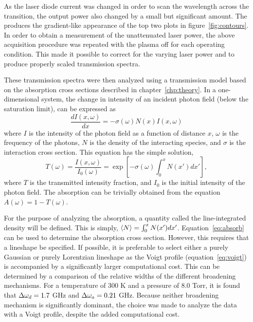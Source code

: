 As the laser diode current was changed in order to scan the wavelength across
the transition, the output power also changed by a small but significant amount.
The produces the gradient-like appearance of the top two plots in
figure~\ref{fig:contours}. In order to obtain a measurement of the unattenuated
laser power, the above acquisition procedure was repeated with the plasma off
for each operating condition. This made it possible to correct for the varying
laser power and to produce properly scaled transmission spectra.

These transmission spectra were then analyzed using a transmission model based
on the absorption cross sections described in chapter~\ref{chp:theory}. In a
one-dimensional system, the change in intensity of an incident photon field
(below the saturation limit), can be expressed as
\begin{equation}
  \frac{dI(x, \omega)}{dx} = -\sigma(\omega) N(x) I(x, \omega)
\end{equation}
where $I$ is the intensity of the photon field as a function of distance $x$,
$\omega$ is the frequency of the photons, $N$ is the density of the interacting
species, and $\sigma$ is the interaction cross section. This equation has the
simple solution,
\begin{equation}
  T(\omega) = \frac{I(x, \omega)}{I_0(\omega)}
            = \exp\left[-\sigma(\omega) \int_0^x N(x') dx'\right],
  \label{eq:transmitted}
\end{equation}
where $T$ is the transmitted intensity fraction, and $I_0$ is the initial
intensity of the photon field. The absorption can be trivially obtained from the
equation $A(\omega) = 1 - T(\omega)$.

For the purpose of analyzing the absorption, a quantity called the
line-integrated density will be defined. This is simply, $\langle N \rangle = \int_0^x
N(x')dx'$. Equation~\ref{eq:absorb} can be used to determine the absorption
cross section. However, this requires that a lineshape be specified. If
possible, it is preferable to select either a purely Gaussian or purely
Lorentzian lineshape as the Voigt profile (equation~\ref{eq:voigt}) is
accompanied by a significantly larger computational cost. This can be determined
by a comparison of the relative widths of the different broadening mechanisms.
For a temperature of 300 K and a pressure of 8.0 Torr, it is found that $\Delta \omega_d =
1.7$ GHz and $\Delta \omega_a = 0.21$ GHz. Because neither broadening mechanism is
significantly dominant, the choice was made to analyze the data with a Voigt
profile, despite the added computational cost.

